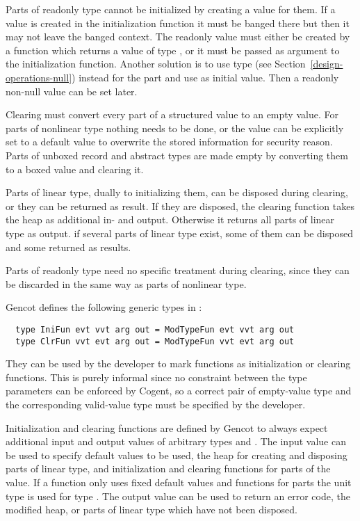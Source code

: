 Parts of readonly type  cannot be initialized by creating a value for them. If a value is created in the 
initialization function it must be banged there but then it may not leave the banged context. The readonly value 
must either be created by a function which returns a value of type , or it must be passed as argument
to the initialization function. Another solution is to use type  (see Section~\ref{design-operations-null})
instead for the part and use  as initial value. Then a readonly non-null value can be set later. 

Clearing must convert every part of a structured value to an empty value. For parts of nonlinear type nothing
needs to be done, or the value can be explicitly set to a default value to overwrite the stored information for
security reason. Parts of unboxed record and abstract types are made empty by converting them to a boxed value 
and clearing it. 

Parts of linear type, dually to initializing them, can be disposed during clearing, or they can be returned
as result. If they are disposed, the clearing function takes the heap as additional in- and output. Otherwise
it returns all parts of linear type as output. if several parts
of linear type exist, some of them can be disposed and some returned as results.

Parts of readonly type need no specific treatment during clearing, since they can be discarded in the same way as
parts of nonlinear type.

Gencot defines the following generic types in :
\begin{verbatim}
  type IniFun evt vvt arg out = ModTypeFun evt vvt arg out
  type ClrFun vvt evt arg out = ModTypeFun vvt evt arg out
\end{verbatim}
They can be used by the developer to mark functions as initialization or clearing functions. This is purely 
informal since no constraint between the type parameters can be enforced by Cogent, so a correct pair of 
empty-value type and the corresponding valid-value type must be specified by the developer.

Initialization and clearing functions are defined by Gencot to always expect additional input and output values of 
arbitrary types  and . The input value can be used to specify default values to be used,
the heap for creating and disposing parts of linear type, and initialization and clearing 
functions for parts of the value. If a function only uses fixed default values and functions for parts 
the unit type \code{()} is used for type . The output value can be used to return an error code,
the modified heap, or parts of linear type which have not been disposed.

